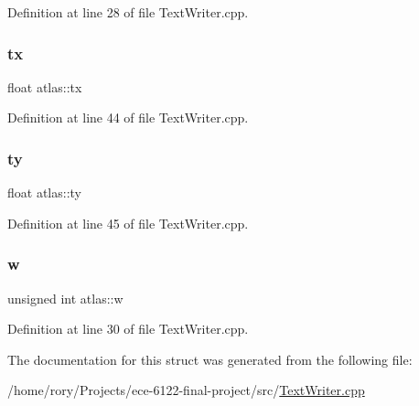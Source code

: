 Definition at line 28 of file Text\+Writer.\+cpp.

\mbox{\label{structatlas_ada99d3ec259f84b4d8bb1a8c46788191}} 
\subsubsection{\texorpdfstring{tx}{tx}}
{\footnotesize\ttfamily float atlas\+::tx}



Definition at line 44 of file Text\+Writer.\+cpp.

\mbox{\label{structatlas_a758aa30e6372d85fd7562492bb5510cd}} 
\subsubsection{\texorpdfstring{ty}{ty}}
{\footnotesize\ttfamily float atlas\+::ty}



Definition at line 45 of file Text\+Writer.\+cpp.

\mbox{\label{structatlas_a9c95ce93a23b235ef4dc53bac9752b07}} 
\subsubsection{\texorpdfstring{w}{w}}
{\footnotesize\ttfamily unsigned int atlas\+::w}



Definition at line 30 of file Text\+Writer.\+cpp.



The documentation for this struct was generated from the following file\+:\begin{DoxyCompactItemize}
\item 
/home/rory/\+Projects/ece-\/6122-\/final-\/project/src/\hyperlink{_text_writer_8cpp}{Text\+Writer.\+cpp}\end{DoxyCompactItemize}
